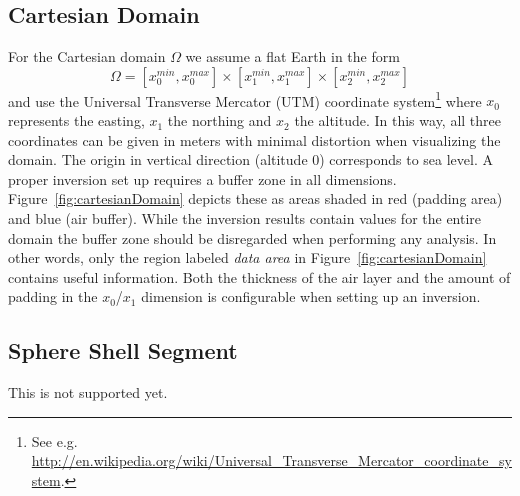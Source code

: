 \subsection{Cartesian Domain}
For the Cartesian domain $\Omega$ we assume a flat Earth in the form
\begin{equation} \label{REF:EQU:INTRO 8}
\Omega = [x^{min}_0, x^{max}_0] \times
 [x^{min}_1, x^{max}_1] \times
 [x^{min}_2, x^{max}_2] 
\end{equation} 
and use the Universal Transverse Mercator (UTM) coordinate system\footnote{See
    e.g. \url{http://en.wikipedia.org/wiki/Universal_Transverse_Mercator_coordinate_system}.}
where $x_0$ represents the easting, $x_1$ the northing and $x_2$ the altitude.
In this way, all three coordinates can be given in meters with minimal
distortion when visualizing the domain.
The origin in vertical direction (altitude 0) corresponds to sea level.
A proper inversion set up requires a buffer zone in all dimensions.
Figure~\ref{fig:cartesianDomain} depicts these as areas shaded in red (padding
area) and blue (air buffer).
While the inversion results contain values for the entire domain the buffer zone
should be disregarded when performing any analysis.
In other words, only the region labeled \emph{data area} in
Figure~\ref{fig:cartesianDomain} contains useful information.
Both the thickness of the air layer and the amount of padding in the $x_0$/$x_1$
dimension is configurable when setting up an inversion.


\subsection{Sphere Shell Segment}
This is not supported yet.













 

